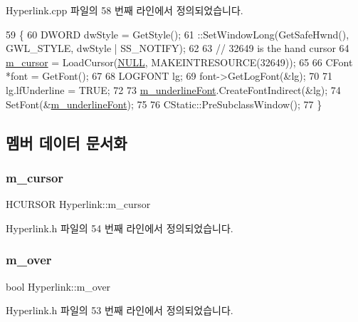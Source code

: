 Hyperlink.\+cpp 파일의 58 번째 라인에서 정의되었습니다.


\begin{DoxyCode}
59 \{
60   DWORD dwStyle = GetStyle();
61   ::SetWindowLong(GetSafeHwnd(), GWL\_STYLE, dwStyle | SS\_NOTIFY);
62 
63   \textcolor{comment}{// 32649 is the hand cursor}
64   \mbox{\hyperlink{class_hyperlink_a1caebeaeff16f7e5cf3a15718490b0c6}{m\_cursor}} = LoadCursor(\mbox{\hyperlink{getopt1_8c_a070d2ce7b6bb7e5c05602aa8c308d0c4}{NULL}}, MAKEINTRESOURCE(32649));
65 
66   CFont *font = GetFont();
67 
68   LOGFONT lg;
69   font->GetLogFont(&lg);
70 
71   lg.lfUnderline = TRUE;
72   
73   \mbox{\hyperlink{class_hyperlink_a613980484b9ae1fbbb22d84b60fa1f33}{m\_underlineFont}}.CreateFontIndirect(&lg);
74   SetFont(&\mbox{\hyperlink{class_hyperlink_a613980484b9ae1fbbb22d84b60fa1f33}{m\_underlineFont}});
75     
76   CStatic::PreSubclassWindow();
77 \}
\end{DoxyCode}


\subsection{멤버 데이터 문서화}
\mbox{\label{class_hyperlink_a1caebeaeff16f7e5cf3a15718490b0c6}} 
\subsubsection{\texorpdfstring{m\+\_\+cursor}{m\_cursor}}
{\footnotesize\ttfamily H\+C\+U\+R\+S\+OR Hyperlink\+::m\+\_\+cursor}



Hyperlink.\+h 파일의 54 번째 라인에서 정의되었습니다.

\mbox{\label{class_hyperlink_a78f23c373fa8a3e7deb0cd9e0f8100f4}} 
\subsubsection{\texorpdfstring{m\+\_\+over}{m\_over}}
{\footnotesize\ttfamily bool Hyperlink\+::m\+\_\+over}



Hyperlink.\+h 파일의 53 번째 라인에서 정의되었습니다.

\mbox{\label{class_hyperlink_a613980484b9ae1fbbb22d84b60fa1f33}} 
